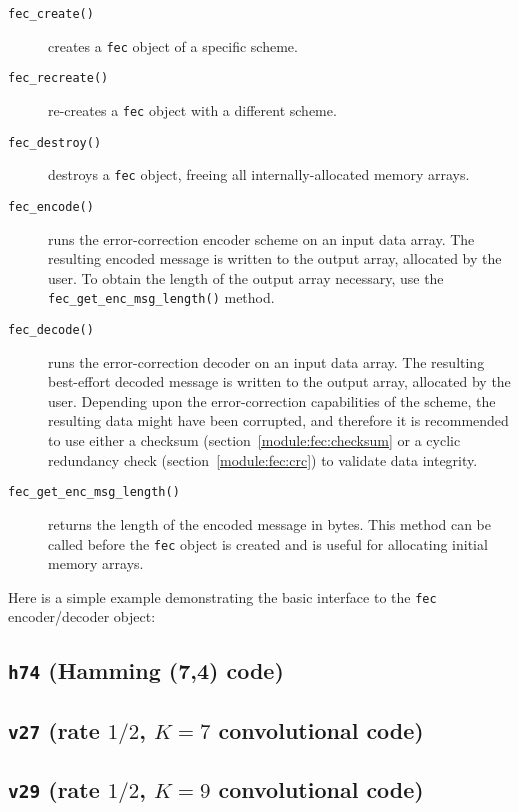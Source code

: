 \begin{description}
\item[{\tt fec\_create()}]
    creates a {\tt fec} object of a specific scheme.
\item[{\tt fec\_recreate()}]
    re-creates a {\tt fec} object with a different scheme.
\item[{\tt fec\_destroy()}]
    destroys a {\tt fec} object, freeing all internally-allocated memory
    arrays.
\item[{\tt fec\_encode()}]
    runs the error-correction encoder scheme on an input data array.
    The resulting encoded message is written to the output array, allocated by
    the user.
    To obtain the length of the output array necessary, use the
    {\tt fec\_get\_enc\_msg\_length()} method.
\item[{\tt fec\_decode()}]
    runs the error-correction decoder on an input data array.
    The resulting best-effort decoded message is written to the output array,
    allocated by the user.
    Depending upon the error-correction capabilities of the scheme, the
    resulting data might have been corrupted, and therefore it is recommended
    to use either a
    checksum (section~\ref{module:fec:checksum} or a
    cyclic redundancy check (section~\ref{module:fec:crc})
    to validate data integrity.
\item[{\tt fec\_get\_enc\_msg\_length()}]
    returns the length of the encoded message in bytes.
    This method can be called before the {\tt fec} object is created and is
    useful for allocating initial memory arrays.
\end{description}

Here is a simple example demonstrating the basic interface to the {\tt fec}
encoder/decoder object:


\subsection{{\tt h74} (Hamming (7,4) code)}
\label{module:fec:h74}

\subsection{{\tt v27} (rate $1/2$, $K=7$ convolutional code)}
\label{module:fec:v27}

\subsection{{\tt v29} (rate $1/2$, $K=9$ convolutional code)}
\label{module:fec:v29}

